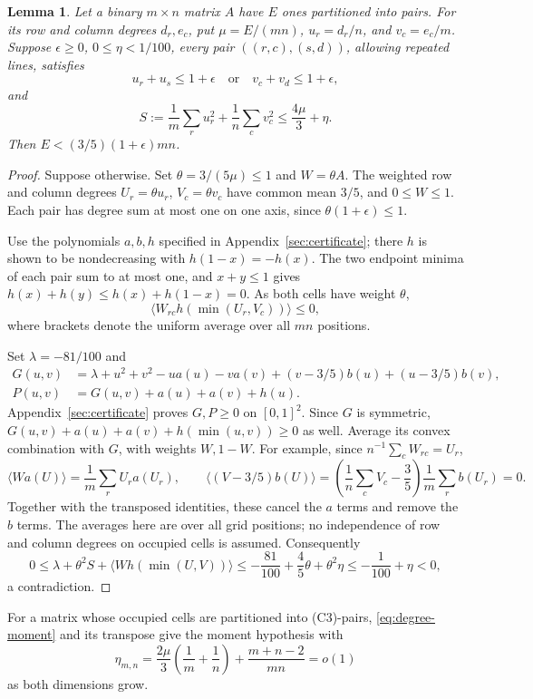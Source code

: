 \documentclass[11pt]{article}
\newtheorem{lemma}[theorem]{Lemma}
\begin{document}
\begin{lemma}\label{lem:lightmatrix}
Let a binary $m\times n$ matrix $A$ have $E$ ones partitioned into pairs.
For its row and column degrees $d_r,e_c$, put $\mu=E/(mn)$,
$u_r=d_r/n$, and $v_c=e_c/m$. Suppose $\epsilon\ge0$, $0\le\eta<1/100$,
every pair $((r,c),(s,d))$, allowing repeated lines, satisfies
\[
 u_r+u_s\le1+\epsilon\quad\text{or}\quad v_c+v_d\le1+\epsilon,
\]
and
\[
 S:=\frac1m\sum_r u_r^2+\frac1n\sum_c v_c^2\le\frac{4\mu}{3}+\eta.
\]
Then $E<(3/5)(1+\epsilon)mn$.
\end{lemma}
\begin{proof}
Suppose otherwise. Set $\theta=3/(5\mu)\le1$ and $W=\theta A$.
The weighted row and column degrees $U_r=\theta u_r$, $V_c=\theta v_c$
have common mean $3/5$, and $0\le W\le1$. Each pair has degree sum
at most one on one axis, since $\theta(1+\epsilon)\le1$.

Use the polynomials $a,b,h$ specified in Appendix~\ref{sec:certificate};
there $h$ is shown to be nondecreasing with $h(1-x)=-h(x)$.
The two endpoint minima of each pair
sum to at most one, and $x+y\le1$ gives
$h(x)+h(y)\le h(x)+h(1-x)=0$. As both cells have weight $\theta$,
\[
 \langle W_{rc}h(\min(U_r,V_c))\rangle\le0,
\]
where brackets denote the uniform average over all $mn$ positions.

Set $\lambda=-81/100$ and
\begin{align*}
 G(u,v)&=\lambda+u^2+v^2-ua(u)-va(v)
                    +(v-3/5)b(u)+(u-3/5)b(v),\\
 P(u,v)&=G(u,v)+a(u)+a(v)+h(u).
\end{align*}
Appendix~\ref{sec:certificate} proves $G,P\ge0$ on $[0,1]^2$.
Since $G$ is symmetric,
$G(u,v)+a(u)+a(v)+h(\min(u,v))\ge0$ as well.
Average its convex combination with $G$, with weights $W,1-W$.
For example, since $n^{-1}\sum_cW_{rc}=U_r$,
\[
 \langle Wa(U)\rangle=\frac1m\sum_r U_ra(U_r),\qquad
 \langle(V-3/5)b(U)\rangle
 =\left(\frac1n\sum_cV_c-\frac35\right)
   \frac1m\sum_r b(U_r)=0.
\]
Together with the transposed identities, these cancel the $a$ terms
and remove the $b$ terms. The averages here are over all grid positions;
no independence of row and column degrees on occupied cells is assumed.
Consequently
\[
 0\le\lambda+\theta^2S+
       \langle Wh(\min(U,V))\rangle
 \le-\frac{81}{100}+\frac45\theta+\theta^2\eta
 \le-\frac1{100}+\eta<0,
\]
a contradiction.

\end{proof}

For a matrix whose occupied cells are partitioned into (C3)-pairs,
\eqref{eq:degree-moment} and its transpose give the moment hypothesis with
\[
 \eta_{m,n}=\frac{2\mu}{3}\left(\frac1m+\frac1n\right)
       +\frac{m+n-2}{mn}=o(1)
\]
as both dimensions grow.
\end{document}
